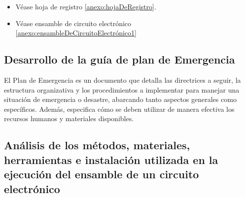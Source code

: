     \begin{itemize}
    \item Véase hoja de registro \ref{anexo:hojaDeRegistro}.
        \item Véase ensamble de circuito electrónico \ref{anexo:ensambleDeCircuitoElectrónico1}
    \end{itemize}
    \subsection{Desarrollo de la guía de plan de Emergencia}
    
    El Plan de Emergencia es un documento que detalla las directrices a seguir, la estructura organizativa y los procedimientos a implementar para manejar una situación de emergencia o desastre, abarcando tanto aspectos generales como específicos. Además, especifica cómo se deben utilizar de manera efectiva los recursos humanos y materiales disponibles.
    \subsection{Análisis de los métodos, materiales, herramientas e instalación utilizada en la ejecución del ensamble de un circuito electrónico}
    
